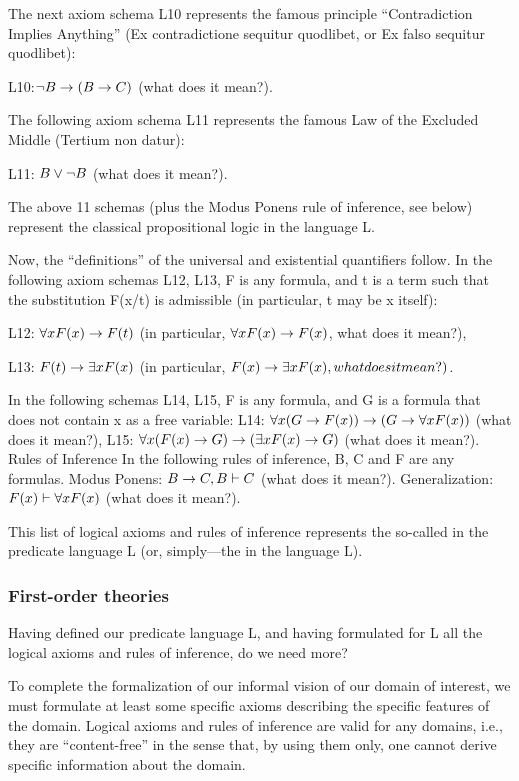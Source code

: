The next axiom schema L10 represents the famous principle ``Contradiction Implies Anything'' (Ex contradictione sequitur quodlibet, or Ex falso sequitur quodlibet):

L10:\( \neg B\rightarrow (B\rightarrow C)\) (what does it mean?).

The following axiom schema L11 represents the famous Law of the Excluded Middle (Tertium non datur):

L11: \(B\vee\neg B\) (what does it mean?).

The above 11 schemas (plus the Modus Ponens rule of inference, see below) represent the classical propositional logic in the language L.

Now, the ``definitions'' of the universal and existential quantifiers follow.
In the following axiom schemas L12, L13, F is any formula, and t is a term such that the substitution F(x/t)
is admissible (in particular, t may be x itself):

L12: \(\forall xF(x)\rightarrow F(t)\) (in particular, \(\forall xF(x)\rightarrow F(x)\), what does it mean?),

L13: \(F(t)\rightarrow \exists xF(x)\) (in particular, \(F(x)\rightarrow \exists xF(x), what does it mean?)\).

In the following schemas L14, L15, F is any formula, and G is a formula that does not contain x as a free
variable:
L14: \(\forall x(G\rightarrow F(x))\rightarrow (G\rightarrow \forall xF(x))\) (what does it mean?),
L15: \(\forall x(F(x)\rightarrow G)\rightarrow (\exists xF(x)\rightarrow G)\) (what does it mean?).
Rules of Inference
In the following rules of inference, B, C and F are any formulas.
Modus Ponens: \(B\rightarrow C, B \vdash C\) (what does it mean?).
Generalization: \(F(x)\vdash \forall xF(x)\) (what does it mean?).

This list of logical axioms and rules of inference represents the so-called  in the predicate language L (or, simply---the  in the language L).

\subsubsection*{First-order theories}

Having defined our predicate language L, and having formulated for L all the logical axioms and rules of inference, do we need more?

To complete the formalization of our informal vision of our domain of interest, we must formulate at least some specific axioms describing the specific features of the domain. Logical axioms and rules of inference are valid for any domains, i.e., they are ``content-free'' in the sense that, by using them only, one cannot derive specific information about the domain.

